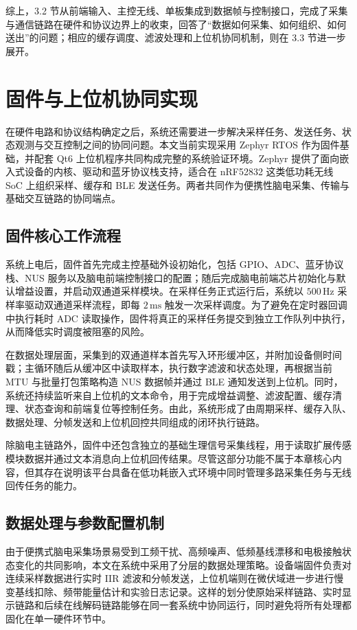 综上，3.2 节从前端输入、主控无线、单板集成到数据帧与控制接口，完成了采集与通信链路在硬件和协议边界上的收束，回答了“数据如何采集、如何组织、如何送出”的问题；相应的缓存调度、滤波处理和上位机协同机制，则在 3.3 节进一步展开。

\section{固件与上位机协同实现}

在硬件电路和协议结构确定之后，系统还需要进一步解决采样任务、发送任务、状态观测与交互控制之间的协同问题。本文当前实现采用 Zephyr RTOS 作为固件基础，并配套 Qt6 上位机程序共同构成完整的系统验证环境。Zephyr 提供了面向嵌入式设备的内核、驱动和蓝牙协议栈支持\cite{zephyr_project_docs}，适合在 nRF52832 这类低功耗无线 SoC 上组织采样、缓存和 BLE 发送任务。两者共同作为便携性脑电采集、传输与基础交互链路的协同端点。

\subsection{固件核心工作流程}

系统上电后，固件首先完成主控基础外设初始化，包括 GPIO、ADC、蓝牙协议栈、NUS 服务以及脑电前端控制接口的配置；随后完成脑电前端芯片初始化与默认增益设置，并启动双通道采样模块。在采样任务正式运行后，系统以 $500\,\mathrm{Hz}$ 采样率驱动双通道采样流程，即每 $2\,\mathrm{ms}$ 触发一次采样调度。为了避免在定时器回调中执行耗时 ADC 读取操作，固件将真正的采样任务提交到独立工作队列中执行，从而降低实时调度被阻塞的风险。

在数据处理层面，采集到的双通道样本首先写入环形缓冲区，并附加设备侧时间戳；主循环随后从缓冲区中读取样本，执行数字滤波和状态处理，再根据当前 MTU 与批量打包策略构造 NUS 数据帧并通过 BLE 通知发送到上位机。同时，系统还持续监听来自上位机的文本命令，用于完成增益调整、滤波配置、缓存清理、状态查询和前端复位等控制任务。由此，系统形成了由周期采样、缓存入队、数据处理、分帧发送和上位机回控共同组成的闭环执行链路。

除脑电主链路外，固件中还包含独立的基础生理信号采集线程，用于读取扩展传感模块数据并通过文本消息向上位机回传结果。尽管这部分功能不属于本章核心内容，但其存在说明该平台具备在低功耗嵌入式环境中同时管理多路采集任务与无线回传任务的能力。

\subsection{数据处理与参数配置机制}

由于便携式脑电采集场景易受到工频干扰、高频噪声、低频基线漂移和电极接触状态变化的共同影响，本文在系统中采用了分层的数据处理策略。设备端固件负责对连续采样数据进行实时 IIR 滤波和分帧发送，上位机端则在微伏域进一步进行慢变基线扣除、频带能量估计和实验日志记录。这样的划分使原始采样链路、实时显示链路和后续在线解码链路能够在同一套系统中协同运行，同时避免将所有处理都固化在单一硬件环节中。


